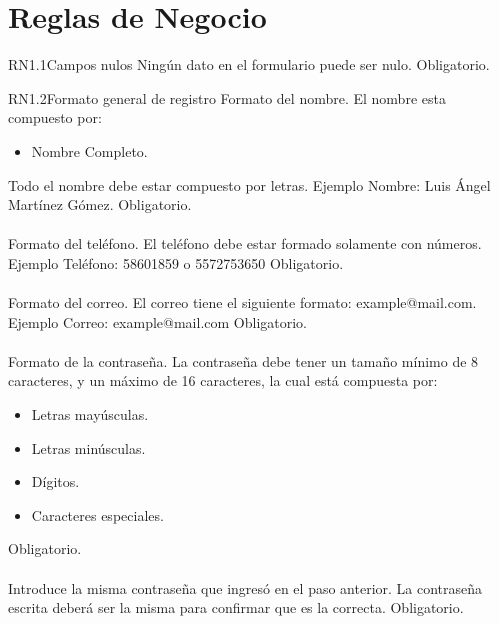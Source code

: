 \section{Reglas de Negocio}

\begin{BussinesRule}{RN1.1}{Campos nulos}
	\BRitem[Descripción:] Ningún dato en el formulario puede ser nulo.
	\BRitem[Nivel:] Obligatorio.
\end{BussinesRule}

\begin{BussinesRule}{RN1.2}{Formato general de registro}
	\BRitem[Nombre:] Formato del nombre.
	\BRitem[Descripción:] El nombre esta compuesto por:
		\begin{itemize}
			\item Nombre Completo.
		\end{itemize}
		Todo el nombre debe estar compuesto por letras.
		Ejemplo 
		Nombre: Luis Ángel Martínez Gómez.
	\BRitem[Nivel:] Obligatorio.\\\\

	\BRitem[Teléfono:] Formato del teléfono.
	\BRitem[Descripción:] El teléfono debe estar formado solamente con números.
		Ejemplo
		Teléfono: 58601859 o 5572753650
	\BRitem[Nivel:] Obligatorio.\\\\

	\BRitem[Teléfono:] Formato del correo.
	\BRitem[Descripción:] El correo tiene el siguiente formato: example@mail.com.
		Ejemplo
		Correo: example@mail.com
	\BRitem[Nivel:] Obligatorio.\\\\

	\BRitem[Contraseña:] Formato de la contraseña.
	\BRitem[Descripción:] La contraseña debe tener un tamaño mínimo de 8 caracteres, y un máximo de 16 caracteres, la cual está compuesta por:
		\begin{itemize}
			\item Letras mayúsculas.
			\item Letras minúsculas.
			\item Dígitos.
			\item Caracteres especiales.
		\end{itemize}
	\BRitem[Nivel:] Obligatorio.\\\\

	 Introduce la misma contraseña que ingresó en el paso anterior.
	\BRitem[Descripción:] La contraseña escrita deberá ser la misma para confirmar que es la correcta.
	\BRitem[Nivel:] Obligatorio.\\\\
\end{BussinesRule}

